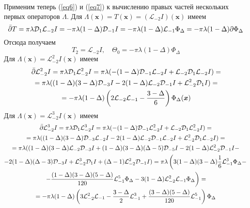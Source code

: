 \documentclass[12pt]{article}
\theoremstyle{definition}
\begin{document}
Применим теперь (\ref{eq6}) и (\ref{eq7}) к вычислению правых частей нескольких первых операторов $\Lambda$. Для $\Lambda(\bm{x})=T(\bm{x})=(\mathcal{L}_{-2}I)(\bm{x})$ имеем
\begin{equation}
    \Bar{\partial}T=\pi\lambda\mathcal{D}_1\mathcal{L}_{-2}I=-\pi\lambda(1-\Delta)\mathcal{D}_{-1}I=-\pi\lambda(1-\Delta)\mathcal{L}_{-1}\Phi_\Delta=-\pi\lambda(1-\Delta)\partial\Phi_\Delta
\end{equation}
Отсюда получаем
\begin{equation}
    T_2=\mathcal{L}_{-2}I,\quad\Theta_0=-\pi\lambda(1-\Delta)\Phi_\Delta
\end{equation}
Для $\Lambda(\bm{x})=\mathcal{L}_{-2}^2I(\bm{x})$ имеем
\begin{multline}\label{eq8}
    \Bar{\partial}\mathcal{L}_{-2}^2I=\pi\lambda\mathcal{D}_1\mathcal{L}^2_{-2}I=\pi\lambda(-(1-\Delta)\mathcal{D}_{-1}\mathcal{L}_{-2}I+\mathcal{L}_{-2}\mathcal{D}_1\mathcal{L}_{-2}I)=\\=\pi\lambda((1-\Delta)(3-\Delta)\mathcal{D}_{-3}I-2(1-\Delta)\mathcal{L}_{-2}\mathcal{D}_{-1}I+\mathcal{L}^2_{-2}\mathcal{D}_1I)=\\=-\pi\lambda(1-\Delta)\left(2\mathcal{L}_{-2}\mathcal{L}_{-1}-\frac{3-\Delta}{6}\right)\Phi_\Delta(\bm{x})
\end{multline}
Для $\Lambda(\bm{x})=\mathcal{L}_{-2}^3I(\bm{x})$ имеем
\begin{multline}
    \Bar{\partial}\mathcal{L}_{-2}^3I=\pi\lambda\mathcal{D}_1\mathcal{L}^3_{-2}I=\pi\lambda(-(1-\Delta)\mathcal{D}_{-1}\mathcal{L}^2_{-2}I+\mathcal{L}_{-2}\mathcal{D}_1\mathcal{L}^2_{-2}I)=\\=\pi\lambda((1-\Delta)(3-\Delta)\mathcal{D}_{-3}\mathcal{L}_{-2}I-2(1-\Delta)\mathcal{L}_{-2}\mathcal{D}_{-1}\mathcal{L}_{-2}I+\mathcal{L}^2_{-2}\mathcal{D}_1\mathcal{L}_{-2}I)=\\=\pi\lambda((1-\Delta)(3-\Delta)\mathcal{L}_{-2}\mathcal{D}_{-3}I+(1-\Delta)(3-\Delta)(\Delta-5)\mathcal{D}_{-5}I-2(1-\Delta)\mathcal{L}_{-2}^2\mathcal{D}_{-1}I-\\-2(1-\Delta)(\Delta-3)\mathcal{D}_{-3}I+\mathcal{L}_{-2}^3\mathcal{D}_1I+(\Delta-1)\mathcal{L}_{-2}^2\mathcal{D}_{-1}I)=\pi\lambda\left(3(1-\Delta)(3-\Delta)\frac{1}{6}\mathcal{L}_{-1}^3\Phi_\Delta-\right.\\\left.-\frac{(1-\Delta)(3-\Delta)(5-\Delta)}{120}\mathcal{L}_{-1}^5\Phi_\Delta-3(1-\Delta)\mathcal{L}_{-2}^2\mathcal{L}_{-1}\Phi_\Delta\right)=\\=-\pi\lambda(1-\Delta)\left(3\mathcal{L}_{-2}^2\mathcal{L}_{-1}-\frac{3-\Delta}{2}\mathcal{L}_{-1}^3+\frac{(3-\Delta)(5-\Delta)}{120}\mathcal{L}_{-1}^5\right)\Phi_\Delta
\end{multline}
\end{document}
